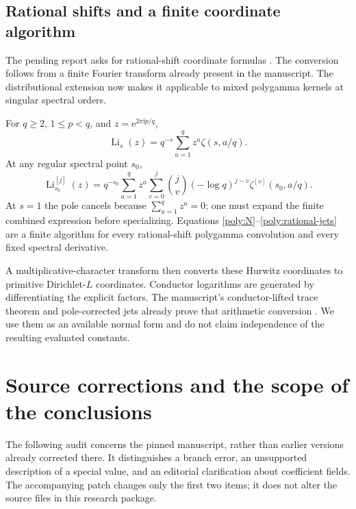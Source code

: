 \documentclass[11pt,letterpaper]{article}
\numberwithin{equation}{section}
\theoremstyle{plain}
\theoremstyle{definition}
\theoremstyle{remark}
\newcommand{\numi}{\mathrm i}
\newcommand{\rme}{\mathrm e}
\newcommand{\rLi}{\operatorname{Li}}
\begin{document}
\subsection{Rational shifts and a finite coordinate algorithm}

The pending report asks for rational-shift coordinate formulas
\cite{RepoIncoming}. The conversion follows from a finite Fourier
transform already present in the manuscript. The distributional
extension now makes it applicable to mixed polygamma kernels at
singular spectral orders.

For \(q\geq2\), \(1\leq p<q\), and \(z=\rme^{2\pi\numi p/q}\),
\begin{equation}\label{poly:rational}
 \rLi_s(z)=q^{-s}\sum_{a=1}^q z^a\zeta(s,a/q).
\end{equation}
At any regular spectral point \(s_0\),
\begin{equation}\label{poly:rational-jets}
 \rLi_{s_0}^{[j]}(z)
 =q^{-s_0}\sum_{a=1}^q z^a
   \sum_{v=0}^j\binom jv(-\log q)^{j-v}
             \zeta^{[v]}(s_0,a/q).
\end{equation}
At \(s=1\) the pole cancels because \(\sum_{a=1}^qz^a=0\);
one must expand the finite combined expression before specializing.
Equations \eqref{poly:N}--\eqref{poly:rational-jets}
are a finite algorithm for every rational-shift polygamma
convolution and every fixed spectral derivative.

A multiplicative-character transform then converts these Hurwitz
coordinates to primitive Dirichlet-\(L\) coordinates. Conductor
logarithms are generated by differentiating the explicit factors.
The manuscript's conductor-lifted trace theorem and pole-corrected
jets already prove that arithmetic conversion \cite{RepoManuscript}.
We use them as an available normal form and do not claim
independence of the resulting evaluated constants.



\section{Source corrections and the scope of the conclusions}
\label{audit:sec:corrections}

The following audit concerns the pinned manuscript, rather than earlier
versions already corrected there.  It distinguishes a branch error, an
unsupported description of a special value, and an editorial clarification
about coefficient fields.  The accompanying patch changes only the first
two items; it does not alter the source files in this research package.
\end{document}
